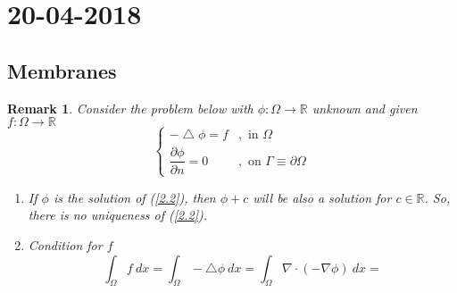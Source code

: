 \documentclass[a4paper,10pt]{article}
\newtheorem{remark}{Remark}
\newcommand{\R}{\mathbb{R}}
\begin{document}
\section{20-04-2018}

\subsection{Membranes}
\begin{remark}
	Consider the problem below with $ \phi : \Omega \rightarrow \R $ unknown and given $ f : \Omega \rightarrow \R $
	\begin{equation}\label{2.2}
			\begin{cases}
			-\bigtriangleup \phi = f &, \text{ in } \Omega \\
			\dfrac{\partial \phi}{\partial n} = 0 &,\text{ on } \Gamma \equiv \partial \Omega 
			\end{cases}
	\end{equation}
	\begin{enumerate}
		\item If $ \phi $ is the solution of (\ref{2.2}), then $ \phi + c $ will be also a solution for $ c \in \R $. So, there is no uniqueness of (\ref{2.2}).
		\item Condition for $ f $
		\[ \int_{\Omega} f \ dx = \int_{\Omega} - \bigtriangleup \phi \ dx = \int_{\Omega} \nabla \cdot (-\nabla \phi) \ dx =  \]
	\end{enumerate}
\end{remark}
\end{document}
